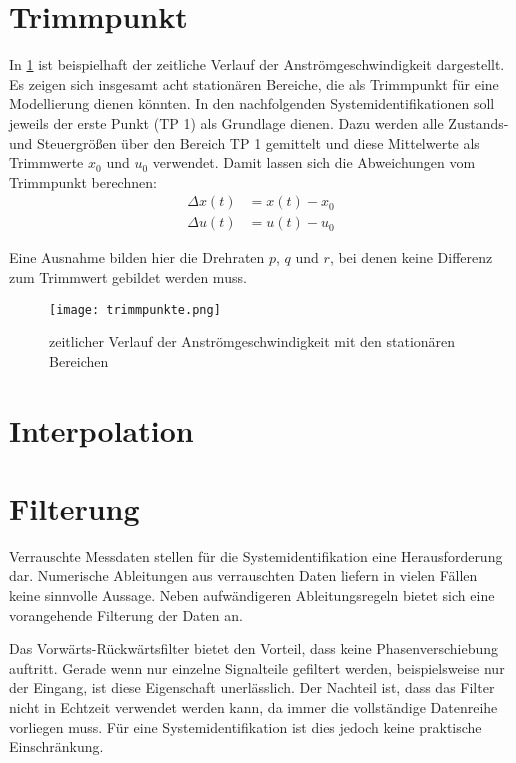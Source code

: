 \section{Trimmpunkt} %
In \cref{fig:trimmpunkte} ist beispielhaft der zeitliche Verlauf der Anströmgeschwindigkeit dargestellt. Es zeigen sich 
insgesamt acht stationären Bereiche, die als Trimmpunkt für eine Modellierung dienen könnten. In den nachfolgenden 
Systemidentifikationen soll jeweils der erste Punkt (TP 1) als Grundlage dienen. Dazu werden alle Zustands- und Steuergrößen 
über den Bereich TP 1 gemittelt und diese Mittelwerte als Trimmwerte $ x_0 $ und $ u_0 $ verwendet. Damit lassen sich die 
Abweichungen vom Trimmpunkt berechnen:
\begin{equation}
	\begin{split}
		\Delta x(t) &= x(t)-x_0\\
		\Delta u(t) &= u(t)-u_0
	\end{split}
\end{equation}

Eine Ausnahme bilden hier die Drehraten $ p $, $ q $ und $ r $, bei denen keine Differenz zum Trimmwert gebildet werden muss.


\begin{figure}
	\centering
	\texttt{[image: trimmpunkte.png]}
	\caption{zeitlicher Verlauf der Anströmgeschwindigkeit mit den stationären Bereichen}
	\label{fig:trimmpunkte}
\end{figure}




\section{Interpolation} %


\section{Filterung} %

Verrauschte Messdaten stellen für die Systemidentifikation eine Herausforderung dar. Numerische Ableitungen aus verrauschten Daten liefern in vielen Fällen keine sinnvolle Aussage. Neben aufwändigeren Ableitungsregeln bietet sich eine vorangehende Filterung der Daten an.

Das Vorwärts-Rückwärtsfilter bietet den Vorteil, dass keine Phasenverschiebung 
auftritt. Gerade wenn nur einzelne Signalteile gefiltert werden, beispielsweise 
nur der Eingang, ist diese Eigenschaft unerlässlich. Der Nachteil ist, dass das 
Filter nicht in Echtzeit verwendet werden kann, da immer die vollständige 
Datenreihe vorliegen muss. Für eine Systemidentifikation ist dies jedoch keine 
praktische Einschränkung.

